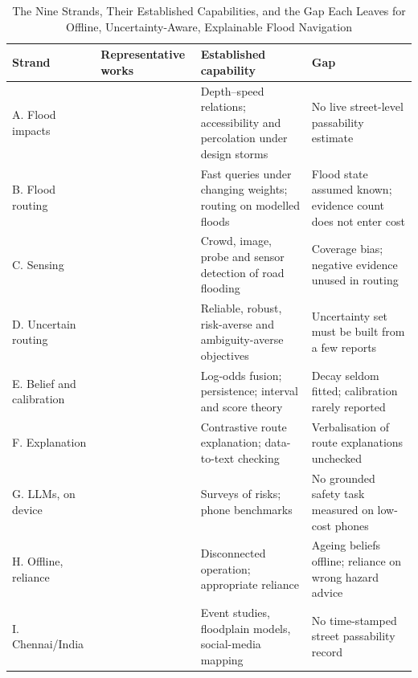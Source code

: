 \documentclass[journal]{IEEEtran}
\begin{document}
\begin{table}[t]
\centering
\caption{The Nine Strands, Their Established Capabilities, and the Gap Each Leaves for Offline, Uncertainty-Aware, Explainable Flood Navigation}
\label{tab:strands}
\footnotesize
\setlength{\tabcolsep}{4pt}
\begin{tabular}{>{\raggedright\arraybackslash}p{2.5cm}>{\raggedright\arraybackslash}p{4.6cm}>{\raggedright\arraybackslash}p{4.4cm}>{\raggedright\arraybackslash}p{4.4cm}}
\toprule
Strand & Representative works & Established capability & Gap \\
\midrule
A. Flood impacts & \cite{pregnolato2017depth,yin2016shanghai,green2017emergency,wang2019percolation,loreti2022local,singh2018vulnerability} & Depth--speed relations; accessibility and percolation under design storms & No live street-level passability estimate \\
B. Flood routing & \cite{delling2007landmark,li2023dijkstra,defaria2026routing,panakkal2023safer,lupa2026stars,jao2025float} & Fast queries under changing weights; routing on modelled floods & Flood state assumed known; evidence count does not enter cost \\
C. Sensing & \cite{praharaj2021waze,safaei2023waze,esparza2023imbalance,hiramoto2025probe,pietrobon2019closure,mydlarz2024floodnet} & Crowd, image, probe and sensor detection of road flooding & Coverage bias; negative evidence unused in routing \\
D. Uncertain routing & \cite{samaranayake2012reliable,filippi2025survey,toumazis2016wcvar,krumm2017riskaware,eyerich2010ctp,gilboa1989maxmin} & Reliable, robust, risk-averse and ambiguity-averse objectives & Uncertainty set must be built from a few reports \\
E. Belief and calibration & \cite{elfes1989occupancy,rosen2016persistence,josang2002beta,brown2001interval,murphy1973partition,guo2017calibration} & Log-odds fusion; persistence; interval and score theory & Decay seldom fitted; calibration rarely reported \\
F. Explanation & \cite{miller2019explanation,schild2025route,alsheeb2023explainable,kale2020t2g2,dusek2020nli,kasner2024quintd} & Contrastive route explanation; data-to-text checking & Verbalisation of route explanations unchecked \\
G. LLMs, on device & \cite{lei2025disaster,zhang2024trafficgpt,laskaridis2024melt,lu2025demystifying,xiao2024pockets,li2024palmbench} & Surveys of risks; phone benchmarks & No grounded safety task measured on low-cost phones \\
H. Offline, reliance & \cite{kulkarni2014hlc,shapiro2011crdt,kleppmann2019localfirst,itoi2017offline,lee2004trust,bansal2021whole} & Disconnected operation; appropriate reliance & Ageing beliefs offline; reliance on wrong hazard advice \\
I. Chennai/India & \cite{radhakrishnan2024chennai,k2026monitoring,natarajan2021flood,ms2022analyzing,karmegam2021chennai,naik2016flooded} & Event studies, floodplain models, social-media mapping & No time-stamped street passability record \\
\bottomrule
\end{tabular}
\end{table}
\end{document}
